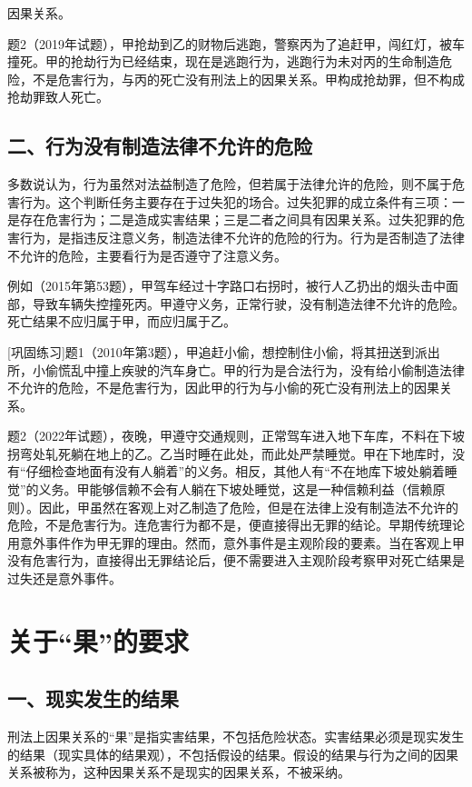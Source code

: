 因果关系。

题2（2019年试题），甲抢劫到乙的财物后逃跑，警察丙为了追赶甲，闯红灯，被车撞死。甲的抢劫行为已经结束，现在是逃跑行为，逃跑行为未对丙的生命制造危险，不是危害行为，与丙的死亡没有刑法上的因果关系。甲构成抢劫罪，但不构成抢劫罪致人死亡。

\subsection*{二、行为没有制造法律不允许的危险}

多数说认为，行为虽然对法益制造了危险，但若属于法律允许的危险，则不属于危害行为。这个判断任务主要存在于过失犯的场合。过失犯罪的成立条件有三项：一是存在危害行为；二是造成实害结果；三是二者之间具有因果关系。过失犯罪的危害行为，是指违反注意义务，制造法律不允许的危险的行为。行为是否制造了法律不允许的危险，主要看行为是否遵守了注意义务。

例如（2015年第53题），甲驾车经过十字路口右拐时，被行人乙扔出的烟头击中面部，导致车辆失控撞死丙。甲遵守义务，正常行驶，没有制造法律不允许的危险。死亡结果不应归属于甲，而应归属于乙。

[巩固练习]题1（2010年第3题），甲追赶小偷，想控制住小偷，将其扭送到派出所，小偷慌乱中撞上疾驶的汽车身亡。甲的行为是合法行为，没有给小偷制造法律不允许的危险，不是危害行为，因此甲的行为与小偷的死亡没有刑法上的因果关系。

题2（2022年试题），夜晚，甲遵守交通规则，正常驾车进入地下车库，不料在下坡拐弯处轧死躺在地上的乙。乙当时睡在此处，而此处严禁睡觉。甲在下地库时，没有“仔细检查地面有没有人躺着”的义务。相反，其他人有“不在地库下坡处躺着睡觉”的义务。甲能够信赖不会有人躺在下坡处睡觉，这是一种信赖利益（信赖原则）。因此，甲虽然在客观上对乙制造了危险，但是在法律上没有制造法不允许的危险，不是危害行为。连危害行为都不是，便直接得出无罪的结论。早期传统理论用意外事件作为甲无罪的理由。然而，意外事件是主观阶段的要素。当在客观上甲没有危害行为，直接得出无罪结论后，便不需要进入主观阶段考察甲对死亡结果是过失还是意外事件。

\section{关于“果”的要求}

\subsection*{一、现实发生的结果}

刑法上因果关系的“果”是指实害结果，不包括危险状态。实害结果必须是现实发生的结果（现实具体的结果观），不包括假设的结果。假设的结果与行为之间的因果关系被称为，这种因果关系不是现实的因果关系，不被采纳。

